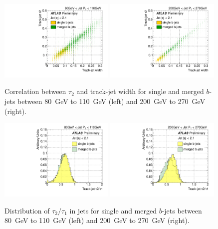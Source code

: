 \begin{figure}[tp]
\centering
\includegraphics[width=0.49\textwidth]{FIGS/VarsSingleMerged/Tau2trkWidth080.pdf}
\includegraphics[width=0.49\textwidth]{FIGS/VarsSingleMerged/Tau2trkWidth200.pdf}
\caption{Correlation between $\tau _2$ and track-jet width for single and merged $b$-jets between 80~GeV to 110~GeV (left) and 200~GeV to 270~GeV (right).}
\label{fig:tau2trkwidthsinglemerged}
\end{figure}

\begin{figure}[tp]
\centering
\includegraphics[width=0.49\textwidth]{FIGS/VarsSingleMerged/TauRatio080.pdf}
\includegraphics[width=0.49\textwidth]{FIGS/VarsSingleMerged/TauRatio200.pdf}
\caption{Distribution of $\tau_2/\tau_1$ in jets for single and merged $b$-jets between 80~GeV to 110~GeV (left) and 200~GeV to 270~GeV (right).}
\label{fig:tauratiosinglemerged}
\end{figure}



